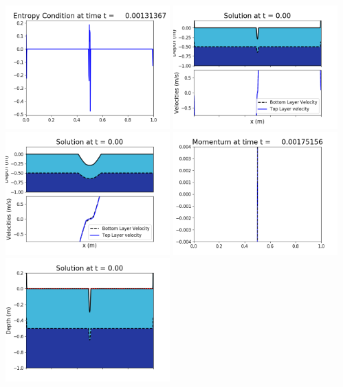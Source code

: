 \documentclass[11pt]{article}
\begin{document}
\vskip 10pt 
\includegraphics[width=0.475\textwidth]{frame0004fig1009.png}
\vskip 10pt 
\includegraphics[width=0.475\textwidth]{frame0005fig1001.png}
\includegraphics[width=0.475\textwidth]{frame0005fig1002.png}
\vskip 10pt 
\includegraphics[width=0.475\textwidth]{frame0005fig1003.png}
\includegraphics[width=0.475\textwidth]{frame0005fig1006.png}
\end{document}
